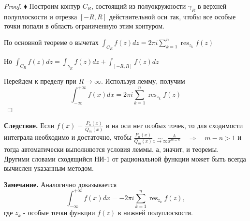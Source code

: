 \documentclass[a4paper, 12pt]{report}
\DeclareMathOperator*{\res}{res}
\begin{document}
\begin{proof}
    $\blacklozenge$ Построим контур $C_R$, состоящий из полуокружности $\gamma_R$ в верхней полуплоскости и отрезка $[-R, R]$ действительной оси
    так, чтобы все особые точки попали в область ограниченную этим контуром. \\
    \begin{center}
    \end{center}
    \par По основной теореме о вычетах
    $\displaystyle \int_{C_R} f(z)dz = 2\pi i \sum_{k=1}^n \res_{z_k} f(z)$ \par
    Но $\displaystyle \int_{C_R} f(z)dz = \int_{\gamma_R} f(z)dz + \int_{[-R, R]} f(z)dz$ \par\bigskip
    Перейдем к пределу при $R \to \infty$. Используя лемму, получим \\
    $$\displaystyle \int_{-\infty}^{+\infty}f(x)dx = 2\pi i \sum_{k=1}^n \res_{z_k} f(z)$$ \blacksquare
\end{proof}

\par\bigskip
\textbf{Следствие. } \quad
    Если $\displaystyle f(x)=\frac{P_n(x)}{Q_m(x)}$ и на оси нет особых точек, то для сходимости интеграла необходимо и достаточно, чтобы
    $\displaystyle \frac{P_n(x)}{Q_m(x)} \underset{x \to \infty}{\sim} \frac{A}{x^{m-n}} \quad \Rightarrow \quad m-n>1$ и тогда автоматически выполняются условия леммы, а, значит, и теоремы. \\
    Другими словами сходящийся НИ-1 от рациональной функции может быть всегда вычислен указанным методом.
    
\par\bigskip
\textbf{Замечание.} \quad
    Аналогично доказывается
    \begin{equation*}
        \int_{-\infty}^{+\infty} f(x)dx = -2\pi i \sum_{k=1}^n \res_{z_k} f(z),
    \end{equation*}
    где $z_k$ - особые точки функции $f(z)$ в нижней полуплоскости.
\end{document}
